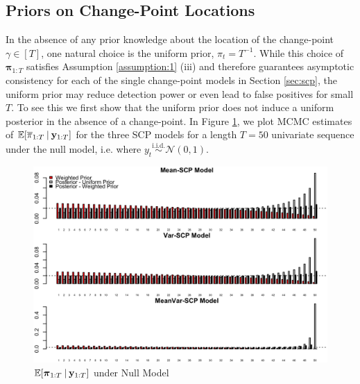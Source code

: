\subsection{Priors on Change-Point Locations}

\label{app:prior}

In the absence of any prior knowledge about the location of the change-point $\gamma \in [T]$, one natural choice is the uniform prior, $\pi_t = T^{-1}$. While this choice of $\boldsymbol{\pi}_{1:T}$ satisfies Assumption \ref{assumption:1} (iii) and therefore guarantees asymptotic consistency for each of the single change-point models in Section \ref{sec:scp}, the uniform prior may reduce detection power or even lead to false positives for small $T$. To see this we first show that the uniform prior does not induce a uniform posterior in the absence of a change-point. In Figure \ref{fig:post-probs-plot}, we plot MCMC estimates of $\mathbb{E}[\overline{\pi}_{1:T} \:|\: \mathbf{y}_{1:T}]$ for the three SCP models for a length $T=50$ univariate sequence under the null model, i.e. where $y_t \overset{\text{i.i.d.}}{\sim}\mathcal{N}(0,1)$. 
\begin{figure}[!h]
    \centering
    \includegraphics[scale = 0.27]{MICH/Figures/prior_choice_plot.png}
    \caption{$\mathbb{E}[\boldsymbol{\pi}_{1:T}\:|\: \mathbf{y}_{1:T}]$ under Null Model}
    \label{fig:post-probs-plot}
\end{figure}

